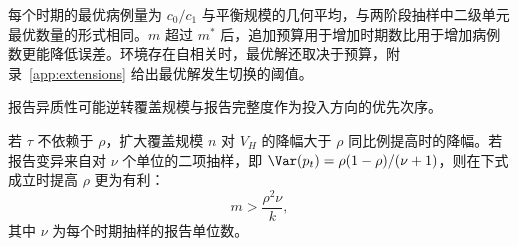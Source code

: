 每个时期的最优病例量为 $c_0/c_1$ 与平衡规模的几何平均，与两阶段抽样中二级单元最优数量的形式相同\citep{cochran1977sampling}。$m$ 超过 $m^*$ 后，追加预算用于增加时期数比用于增加病例数更能降低误差。环境存在自相关时，最优解还取决于预算，附录~\ref{app:extensions} 给出最优解发生切换的阈值。

报告异质性可能逆转覆盖规模与报告完整度作为投入方向的优先次序。

\begin{corollary}[覆盖规模与报告完整度的比较]
\label{cor:switch}
若 $\tau$ 不依赖于 $\rho$，扩大覆盖规模 $n$ 对 $V_H$ 的降幅大于 $\rho$ 同比例提高时的降幅。若报告变异来自对 $\nu$ 个单位的二项抽样，即 $\Var(p_t)=\rho(1-\rho)/(\nu+1)$，则在下式成立时提高 $\rho$ 更为有利：
\begin{equation}
  m>\frac{\rho^2\nu}{k},
  \label{eq:r3-switch}
\end{equation}
其中 $\nu$ 为每个时期抽样的报告单位数。
\end{corollary}
